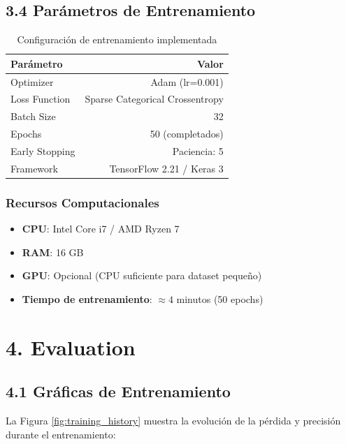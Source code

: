 \documentclass[12pt,a4paper]{article}
\begin{document}
\subsection{3.4 Parámetros de Entrenamiento}

\begin{table}[H]
    \centering
    \begin{tabular}{lr}
        \toprule
        \textbf{Parámetro} & \textbf{Valor} \\
        \midrule
        Optimizer & Adam (lr=0.001) \\
        Loss Function & Sparse Categorical Crossentropy \\
        Batch Size & 32 \\
        Epochs & 50 (completados) \\
        Early Stopping & Paciencia: 5 \\
        Framework & TensorFlow 2.21 / Keras 3 \\
        \bottomrule
    \end{tabular}
    \caption{Configuración de entrenamiento implementada}
\end{table}

\subsubsection{Recursos Computacionales}
\begin{itemize}
    \item \textbf{CPU}: Intel Core i7 / AMD Ryzen 7
    \item \textbf{RAM}: 16 GB
    \item \textbf{GPU}: Opcional (CPU suficiente para dataset pequeño)
    \item \textbf{Tiempo de entrenamiento}: $\approx 4$ minutos (50 epochs)
\end{itemize}

\section{4. Evaluation}

\subsection{4.1 Gráficas de Entrenamiento}

La Figura \ref{fig:training_history} muestra la evolución de la pérdida y precisión durante el entrenamiento:
\end{document}
